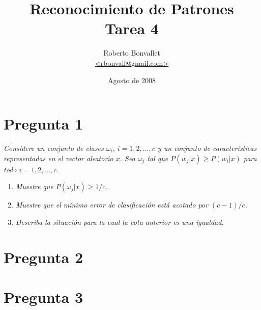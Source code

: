 \documentclass[spanish]{article}
\title{Reconocimiento de Patrones \\ Tarea 4}
\author{Roberto Bonvallet \\ \url {<rbonvall@gmail.com>}}
\date{Agosto de 2008}
\newcommand{\pregunta}{\textit}
\begin{document}
\maketitle

\section*{Pregunta 1}
\pregunta{
    Considere un conjunto de clases $\omega_i$, $i = 1, 2, \ldots, c$ y un conjunto de
    características representadas en el vector aleatorio $x$.  Sea $\omega_j$ tal que
    $P(w_j\vert x)\ge P(w_i\vert x)$ para todo $i = 1, 2, \ldots, c$.
}
\begin{enumerate}
    \item \pregunta{Muestre que $P(\omega_j\vert x) \ge 1/c$.}
    \item \pregunta{Muestre que el mínimo error de clasificación está acotado por $(c - 1)/c$.}
    \item \pregunta{Describa la situación para la cual la cota anterior es una igualdad.}
\end{enumerate}

\section*{Pregunta 2}
\pregunta{
}

\section*{Pregunta 3}
\pregunta{
}
\end{document}
